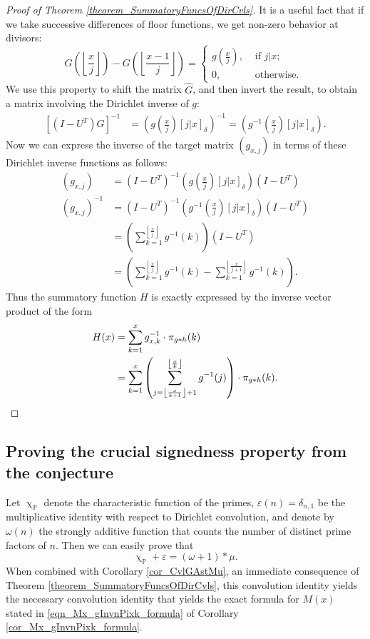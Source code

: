 \documentclass[11pt,reqno,a4letter]{article}
\numberwithin{figure}{section}
\numberwithin{table}{section}
\newcommand{\Iverson}[1]{\ensuremath{\left[#1\right]_{\delta}}}
\newcommand{\floor}[1]{\left\lfloor #1 \right\rfloor}
\renewcommand{\chi}{\upchi}
\theoremstyle{plain}
\numberwithin{theorem}{section}
\theoremstyle{definition}
\begin{document}
\begin{proof}[Proof of Theorem \ref{theorem_SummatoryFuncsOfDirCvls}]
It is a useful fact that if we take successive differences of floor functions, we get non-zero behavior at divisors: 
\[
G\left(\floor{\frac{x}{j}}\right) - G\left(\floor{\frac{x-1}{j}}\right) = 
     \begin{cases} 
     g\left(\frac{x}{j}\right), & \text{ if $j | x$; } \\ 
     0, & \text{ otherwise. } 
     \end{cases}
\]
We use this property to shift the matrix $\hat{G}$, and then invert the result, to obtain a matrix involving the 
Dirichlet inverse of $g$: 
\begin{align*} 
\left[(I-U^{T}) \hat{G}\right]^{-1} & = \left(g\left(\frac{x}{j}\right) \Iverson{j|x}\right)^{-1} = 
     \left(g^{-1}\left(\frac{x}{j}\right) \Iverson{j|x}\right). 
\end{align*} 
Now we can express the inverse of the target matrix $(g_{x,j})$ in terms of these Dirichlet inverse functions 
as follows: 
\begin{align*} 
(g_{x,j}) & = (I-U^{T})^{-1} \left(g\left(\frac{x}{j}\right) \Iverson{j|x}\right) (I-U^{T}) \\ 
(g_{x,j})^{-1} & = (I-U^{T})^{-1} \left(g^{-1}\left(\frac{x}{j}\right) \Iverson{j|x}\right) (I-U^{T}) \\ 
     & = \left(\sum_{k=1}^{\floor{\frac{x}{j}}} g^{-1}(k)\right) (I-U^{T}) \\ 
     & = \left(\sum_{k=1}^{\floor{\frac{x}{j}}} g^{-1}(k) - \sum_{k=1}^{\floor{\frac{x}{j+1}}} g^{-1}(k)\right). 
\end{align*} 
Thus the summatory function $H$ is exactly expressed by the inverse vector product of the form 
\begin{align*} 
H(x) & = \sum_{k=1}^x g_{x,k}^{-1} \cdot \pi_{g \ast h}(k) \\ 
     & = \sum_{k=1}^x \left(\sum_{j=\floor{\frac{x}{k+1}}+1}^{\floor{\frac{x}{k}}} g^{-1}(j)\right) \cdot \pi_{g \ast h}(k). 
     \qedhere
\end{align*} 
\end{proof} 

\subsection{Proving the crucial signedness property from the conjecture} 

Let $\chi_{\mathbb{P}}$ denote the characteristic function of the primes, 
$\varepsilon(n) = \delta_{n,1}$ be the multiplicative identity with respect to Dirichlet convolution, 
and denote by $\omega(n)$ the strongly additive function that counts the number of 
distinct prime factors of $n$. Then we can easily prove that 
\begin{equation}
\label{eqn_AntiqueDivisorSumIdent} 
\chi_{\mathbb{P}} + \varepsilon = (\omega + 1) \ast \mu. 
\end{equation} 
When combined with Corollary \ref{cor_CvlGAstMu}, an immediate consequence of 
Theorem \ref{theorem_SummatoryFuncsOfDirCvls}, 
this convolution identity yields the necessary convolution identity that yields the exact 
formula for $M(x)$ stated in \eqref{eqn_Mx_gInvnPixk_formula} of 
Corollary \ref{cor_Mx_gInvnPixk_formula}. 
\end{document}
